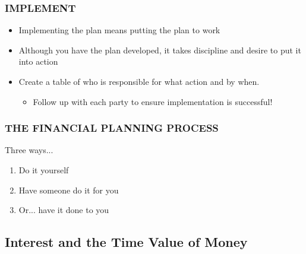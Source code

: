 \documentclass[12pt]{article}
\begin{document}
            \subsubsection{IMPLEMENT}
                \begin{itemize}
                    \item Implementing the plan means putting the plan to work
                    \item Although you have the plan developed, it takes discipline and desire to put it into action
                    \item Create a table of who is responsible for what action and by when.
                        \begin{itemize}
                            \item Follow up with each party to ensure implementation is successful!
                        \end{itemize}
                \end{itemize}
            
            \subsubsection{THE FINANCIAL PLANNING PROCESS}
                Three ways...
                \begin{enumerate}
                    \item Do it yourself
                    \item Have someone do it for you
                    \item Or... have it done to you
                \end{enumerate}

        \subsection{Interest and the Time Value of Money}
\end{document}
